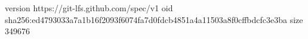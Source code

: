 version https://git-lfs.github.com/spec/v1
oid sha256:ed4793033a7a1b16f2093f6074fa7d0fdcb4851a4a11503a8f0cffbdcfc3e3ba
size 349676
